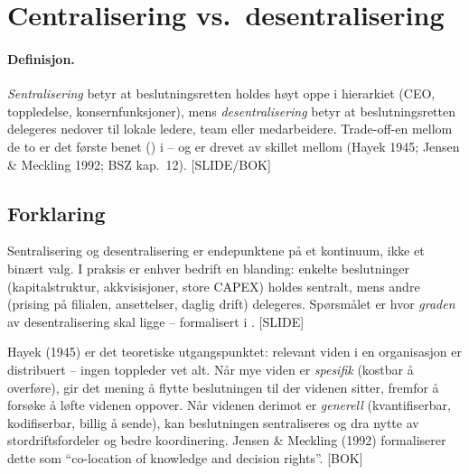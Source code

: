 \section{Centralisering vs.\ desentralisering}\label{thr:centralization-vs-decentralization}

\paragraph{Definisjon.} \emph{Sentralisering} betyr at beslutningsretten holdes høyt oppe i hierarkiet (CEO, toppledelse, konsernfunksjoner), mens \emph{desentralisering} betyr at beslutningsretten delegeres nedover til lokale ledere, team eller medarbeidere. Trade-off-en mellom de to er det første benet (\SOne) i  -- og er drevet av skillet mellom  (Hayek 1945; Jensen \& Meckling 1992; BSZ kap.\ 12). [SLIDE/BOK]

\subsection*{Forklaring}

Sentralisering og desentralisering er endepunktene på et kontinuum, ikke et binært valg. I praksis er enhver bedrift en blanding: enkelte beslutninger (kapitalstruktur, akkvisisjoner, store CAPEX) holdes sentralt, mens andre (prising på filialen, ansettelser, daglig drift) delegeres. Spørsmålet er hvor \emph{graden} av desentralisering skal ligge -- formalisert i . [SLIDE]

Hayek (1945) er det teoretiske utgangspunktet: relevant viden i en organisasjon er distribuert -- ingen toppleder vet alt. Når mye viden er \emph{spesifik} (kostbar å overføre), gir det mening å flytte beslutningen til der videnen sitter, fremfor å forsøke å løfte videnen oppover. Når videnen derimot er \emph{generell} (kvantifiserbar, kodifiserbar, billig å sende), kan beslutningen sentraliseres og dra nytte av stordriftsfordeler og bedre koordinering. Jensen \& Meckling (1992) formaliserer dette som ``co-location of knowledge and decision rights''. [BOK]

